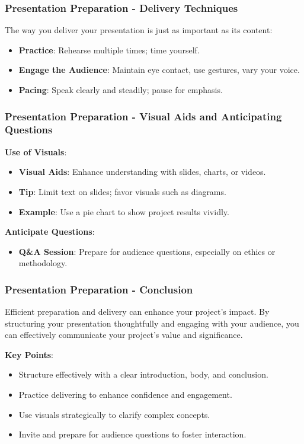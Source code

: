 \documentclass[aspectratio=169]{beamer}
\begin{document}
\begin{frame}[fragile]
  \frametitle{Presentation Preparation - Delivery Techniques}
  The way you deliver your presentation is just as important as its content:

  \begin{itemize}
    \item \textbf{Practice}: Rehearse multiple times; time yourself.
    \item \textbf{Engage the Audience}: Maintain eye contact, use gestures, vary your voice.
    \item \textbf{Pacing}: Speak clearly and steadily; pause for emphasis.
  \end{itemize}
\end{frame}

\begin{frame}[fragile]
  \frametitle{Presentation Preparation - Visual Aids and Anticipating Questions}
  \textbf{Use of Visuals}:
  \begin{itemize}
    \item \textbf{Visual Aids}: Enhance understanding with slides, charts, or videos.
    \item \textbf{Tip}: Limit text on slides; favor visuals such as diagrams.
    \item \textbf{Example}: Use a pie chart to show project results vividly.
  \end{itemize}

  \textbf{Anticipate Questions}:
  \begin{itemize}
    \item \textbf{Q\&A Session}: Prepare for audience questions, especially on ethics or methodology.
  \end{itemize}
\end{frame}

\begin{frame}[fragile]
  \frametitle{Presentation Preparation - Conclusion}
  Efficient preparation and delivery can enhance your project's impact. By structuring your presentation thoughtfully and engaging with your audience, you can effectively communicate your project's value and significance.

  \textbf{Key Points}:
  \begin{itemize}
    \item Structure effectively with a clear introduction, body, and conclusion.
    \item Practice delivering to enhance confidence and engagement.
    \item Use visuals strategically to clarify complex concepts.
    \item Invite and prepare for audience questions to foster interaction.
  \end{itemize}
\end{frame}
\end{document}
